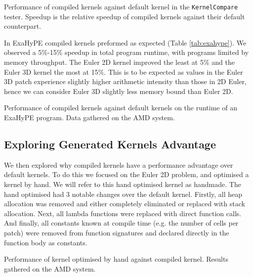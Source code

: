 \begin{table}
    \centering
 
\caption{Performance of compiled kernels against default kernel in the \texttt{KernelCompare} tester. Speedup is the relative speedup of compiled kernels against their default counterpart.}\label{tab:kernel_comapre} 
\end{table}

In ExaHyPE compiled kernels preformed as expected (Table \ref{tab:exahype}).
We observed a 5\%-15\% speedup in total program runtime, with programs limited by memory throughput.
The Euler 2D kernel improved the least at 5\% and the Euler 3D kernel the most at 15\%.
This is to be expected as values in the Euler 3D patch experience slightly higher arithmetic intensity than those in 2D Euler, hence we can consider Euler 3D slightly less memory bound than Euler 2D.
 
\begin{table}
    \centering
 
\caption{Performance of compiled kernels against default kernels on the runtime of an ExaHyPE program. Data gathered on the AMD system.}\label{tab:exahype} 
\end{table}

\subsection{Exploring Generated Kernels Advantage}

We then explored why compiled kernels have a performance advantage over default kernels.
To do this we focused on the Euler 2D problem, and optimised a kernel by hand.
We will refer to this hand optimised kernel as handmade.
The hand optimised had 3 notable changes over the default kernel.
Firstly, all heap allocation was removed and either completely eliminated or replaced with stack allocation.
Next, all lambda functions were replaced with direct function calls.
And finally, all constants known at compile time (e.g. the number of cells per patch) were removed from function signatures and declared directly in the function body as constants.


\begin{table}
    \centering
     
    \caption{Performance of kernel optimised by hand against compiled kernel. Results gathered on the AMD system.}\label{tab:hand_v_compiled}
\end{table}

